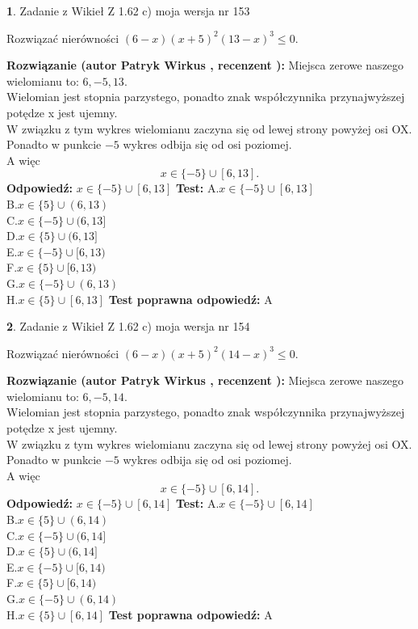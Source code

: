 \documentclass[12pt, a4paper]{article}
\theoremstyle{definition} %
\newtheorem{zad}{}
\newcommand{\zadStart}[1]{\begin{zad}#1\newline}
\newcommand{\zadStop}{\end{zad}}
\newcommand{\rozwStart}[2]{\noindent \textbf{Rozwiązanie (autor #1 , recenzent #2): }\newline}
\newcommand{\rozwStop}{\newline}
\newcommand{\odpStart}{\noindent \textbf{Odpowiedź:}\newline}
\newcommand{\odpStop}{\newline}
\newcommand{\testStart}{\noindent \textbf{Test:}\newline}
\newcommand{\testStop}{\newline}
\newcommand{\kluczStart}{\noindent \textbf{Test poprawna odpowiedź:}\newline}
\newcommand{\kluczStop}{\newline}
\begin{document}
\zadStart{Zadanie z Wikieł Z 1.62 c) moja wersja nr 153}

Rozwiązać nierówności $(6-x)(x+5)^{2}(13-x)^{3}\le0$.
\zadStop
\rozwStart{Patryk Wirkus}{}
Miejsca zerowe naszego wielomianu to: $6, -5, 13$.\\
Wielomian jest stopnia parzystego, ponadto znak współczynnika przy\linebreak najwyższej potędze x jest ujemny.\\ W związku z tym wykres wielomianu zaczyna się od lewej strony powyżej osi OX.\\
Ponadto w punkcie $-5$ wykres odbija się od osi poziomej.\\
A więc $$x \in \{-5\} \cup [6,13].$$
\rozwStop
\odpStart
$x \in \{-5\} \cup [6,13]$
\odpStop
\testStart
A.$x \in \{-5\} \cup [6,13]$\\
B.$x \in \{5\} \cup (6,13)$\\
C.$x \in \{-5\} \cup (6,13]$\\
D.$x \in \{5\} \cup (6,13]$\\
E.$x \in \{-5\} \cup [6,13)$\\
F.$x \in \{5\} \cup [6,13)$\\
G.$x \in \{-5\} \cup (6,13)$\\
H.$x \in \{5\} \cup [6,13]$
\testStop
\kluczStart
A
\kluczStop



\zadStart{Zadanie z Wikieł Z 1.62 c) moja wersja nr 154}

Rozwiązać nierówności $(6-x)(x+5)^{2}(14-x)^{3}\le0$.
\zadStop
\rozwStart{Patryk Wirkus}{}
Miejsca zerowe naszego wielomianu to: $6, -5, 14$.\\
Wielomian jest stopnia parzystego, ponadto znak współczynnika przy\linebreak najwyższej potędze x jest ujemny.\\ W związku z tym wykres wielomianu zaczyna się od lewej strony powyżej osi OX.\\
Ponadto w punkcie $-5$ wykres odbija się od osi poziomej.\\
A więc $$x \in \{-5\} \cup [6,14].$$
\rozwStop
\odpStart
$x \in \{-5\} \cup [6,14]$
\odpStop
\testStart
A.$x \in \{-5\} \cup [6,14]$\\
B.$x \in \{5\} \cup (6,14)$\\
C.$x \in \{-5\} \cup (6,14]$\\
D.$x \in \{5\} \cup (6,14]$\\
E.$x \in \{-5\} \cup [6,14)$\\
F.$x \in \{5\} \cup [6,14)$\\
G.$x \in \{-5\} \cup (6,14)$\\
H.$x \in \{5\} \cup [6,14]$
\testStop
\kluczStart
A
\kluczStop
\end{document}
